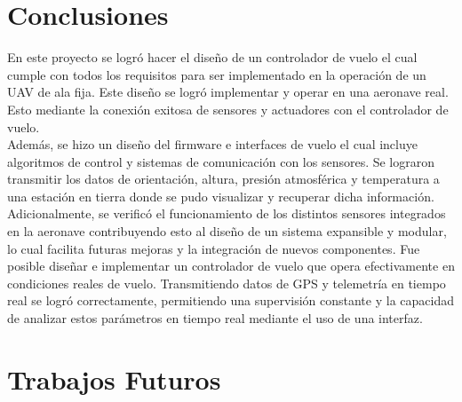 
\section{Conclusiones}



En este proyecto se logró hacer el diseño de un controlador de vuelo el cual cumple con todos los requisitos para ser implementado en la operación de un UAV de ala fija. Este diseño se logró implementar y operar en una aeronave real. Esto mediante la conexión exitosa de sensores y actuadores con el controlador de vuelo.\\

Además, se hizo un diseño del firmware e interfaces de vuelo el cual incluye algoritmos de control y sistemas de comunicación con los sensores. Se lograron transmitir los datos de orientación, altura, presión atmosférica y temperatura a una estación en tierra donde se pudo visualizar y recuperar dicha información.\\

Adicionalmente, se verificó el funcionamiento de los distintos sensores integrados en la aeronave contribuyendo esto al diseño de un sistema expansible y modular, lo cual facilita futuras mejoras y la integración de nuevos componentes. Fue posible diseñar e implementar un controlador de vuelo que opera efectivamente en condiciones reales de vuelo. Transmitiendo datos de GPS y telemetría en tiempo real se logró correctamente, permitiendo una supervisión constante y la capacidad de analizar estos parámetros en tiempo real mediante el uso de una interfaz.\\



\section{Trabajos Futuros}

